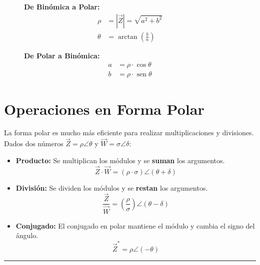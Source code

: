 \documentclass[
  a4paper,
  DIV=11,
  numbers=noendperiod]{scrreprt}
\newcommand{\sen}{\operatorname{sen}}
\begin{document}
\begin{figure}

\begin{minipage}{0.50\linewidth}
\textbf{De Binómica a Polar:} \[
\begin{aligned}
\rho &= |\vec{Z}| = \sqrt{a^2 + b^2} \\
\theta &= \arctan\left(\frac{b}{a}\right)
\end{aligned}
\]\end{minipage}%
%
\begin{minipage}{0.50\linewidth}
\textbf{De Polar a Binómica:} \[
\begin{aligned}
a &= \rho \cdot \cos \theta \\
b &= \rho \cdot \sen \theta
\end{aligned}
\]\end{minipage}%

\end{figure}%

\section{Operaciones en Forma Polar}\label{operaciones-en-forma-polar}

La forma polar es mucho más eficiente para realizar multiplicaciones y
divisiones. Dados dos números \(\vec{Z} = \rho \angle \theta\) y
\(\vec{W} = \sigma \angle \delta\):

\begin{itemize}
\item
  \textbf{Producto:} Se multiplican los módulos y se \textbf{suman} los
  argumentos.
  \[\vec{Z} \cdot \vec{W} = (\rho \cdot \sigma) \angle (\theta + \delta)\]
\item
  \textbf{División:} Se dividen los módulos y se \textbf{restan} los
  argumentos.
  \[\frac{\vec{Z}}{\vec{W}} = \left( \frac{\rho}{\sigma} \right) \angle (\theta - \delta)\]
\item
  \textbf{Conjugado:} El conjugado en polar mantiene el módulo y cambia
  el signo del ángulo. \[\vec{Z}^* = \rho \angle (-\theta)\]
\end{itemize}

\begin{center}\rule{0.5\linewidth}{0.5pt}\end{center}
\end{document}

